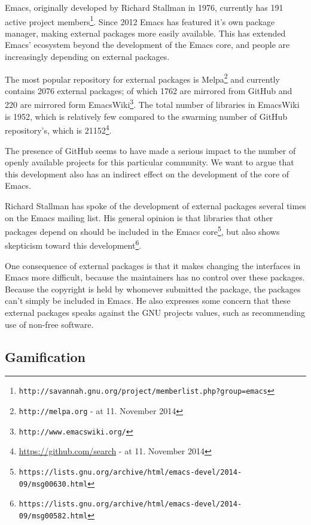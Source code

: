 \documentclass[a4paper,11pt]{article} %
\begin{document}
Emacs, originally developed by Richard Stallman in 1976, currently has
\num{191} active project
members\footnote{\texttt{http://savannah.gnu.org/project/memberlist.php?group=emacs}}.
Since \num{2012} Emacs has featured it's own package manager, making
external packages more easily available. This has extended Emacs' ecosystem
beyond the development of the Emacs core, and people are increasingly
depending on external packages.

The most popular repository for external packages is
Melpa\footnote{\texttt{http://melpa.org} - at 11. November 2014} and
currently contains \num{2076} external packages; of which \num{1762} are
mirrored from GitHub and \num{220} are mirrored form
EmacsWiki\footnote{\texttt{http://www.emacswiki.org/}}. The total number of
libraries in EmacsWiki is \num{1952}, which is relatively few compared to
the swarming number of GitHub repository's, which is
\num{21152}\footnote{\href{https://github.com/search?utf8=\%E2\%9C\%93\&q=language\%3Aemacs-lisp\&type=Repositories\&ref=searchresults}{https://github.com/search} - at 11. November 2014}.

The presence of GitHub seems to have made a serious impact to the number of
openly available projects for this particular community. We want to argue
that this development also has an indirect effect on the development of the
core of Emacs.

Richard Stallman has spoke of the development of external packages several
times on the Emacs mailing list. His general opinion is that libraries that
other packages depend on should be included in the Emacs
core\footnote{\texttt{https://lists.gnu.org/archive/html/emacs-devel/2014-09/msg00630.html}},
but also shows skepticism toward this
development\footnote{\texttt{https://lists.gnu.org/archive/html/emacs-devel/2014-09/msg00582.html}}.

One consequence of external packages is that it makes changing the
interfaces in Emacs more difficult, because the maintainers has no control
over these packages. Because the copyright is held by whomever submitted the
package, the packages can't simply be included in Emacs. He also expresses
some concern that these external packages speaks against the GNU projects
values, such as recommending use of non-free software.

\subsection{Gamification}
\end{document}

